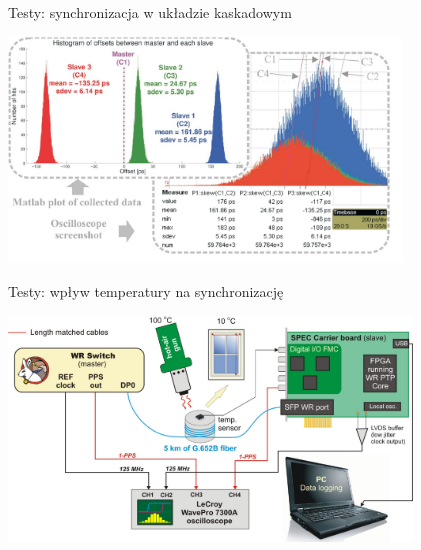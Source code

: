 \documentclass[compress,red]{beamer}
\begin{document}
\begin{frame}{Testy: synchronizacja w układzie kaskadowym}

    \begin{center}
    \includegraphics[height=6.0cm]{measurements/measResults-new.pdf}
    \end{center}


\end{frame}
\begin{frame}{Testy: wpływ temperatury na synchronizację}

    \begin{center}
    \includegraphics[height=6.0cm]{measurements/meas_system_wrcore.pdf}
    \end{center}

\end{frame}
\end{document}
